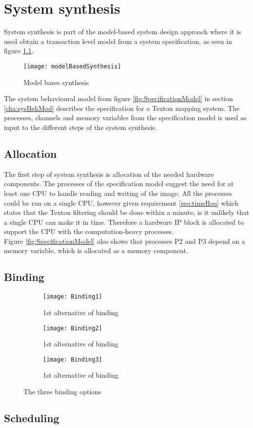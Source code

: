 \chapter{System synthesis}
System synthesis is part of the model-based system design approach where it is used obtain a transaction level model from a system specification, as seen in figure \ref{fig:modelBasedSyn}. 

\begin{figure}[H]
\centering
\texttt{[image: modelBasedSynthesis]}
\caption{Model bases synthesis}
\label{fig:modelBasedSyn}
\end{figure}

The system behavioural model from figure \ref{fig:SpecificationModel} in section \ref{cha:sysBehMod} describes the specification for a Texton mapping system. 
The processes, channels and memory variables from the specification model is used as input to the different steps of the system synthesis.  

\section{Allocation}
The first step of system synthesis is allocation of the needed hardware components. 
The processes of the specification model suggest the need for at least one CPU to handle reading and writing of the image. 
All the processes could be run on a single CPU, however given requirement \ref{req:timeReq} which states that the Texton filtering should be done within a minute, is it unlikely that a single CPU can make it in time. 
Therefore a hardware IP block is allocated to support the CPU with the computation-heavy processes.
\\Figure \ref{fig:SpecificationModel} also shows that processes P2 and P3 depend on a memory variable, which is allocated as a memory component. 

\section{Binding}

\begin{figure}[H]
\centering
\begin{subfigure}{.5\textwidth}
	\centering
	\texttt{[image: Binding1]}
	\caption{1st alternative of binding}
\end{subfigure}%
\begin{subfigure}{.5\textwidth}
	\centering
	\texttt{[image: Binding2]}
	\caption{1st alternative of binding}
\end{subfigure}%

\begin{subfigure}{.5\textwidth}
	\centering
	\texttt{[image: Binding3]}
	\caption{1st alternative of binding}
\end{subfigure}%

\caption{The three binding options}
\label{fig:Binding1}
\end{figure}



\section{Scheduling}